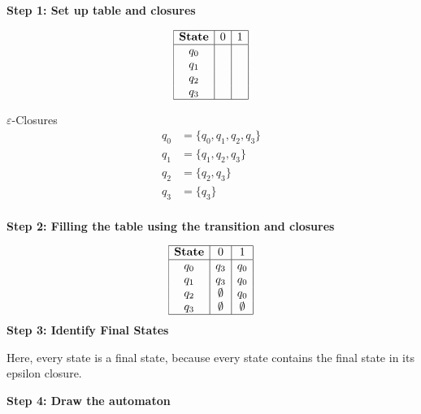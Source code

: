 \textbf{Step 1: Set up table and closures}

\[
    \begin{array}{|c|c|c|}
    \hline
    \textbf{State} & 0              & 1    \\
    \hline
    q_0            &  &   \\
    q_1   &  &   \\
    q_2   &  &   \\
    q_3   &  &   \\
    \hline
    \end{array}
\]

\(\varepsilon\)-Closures
\begin{align*}
    q_0 &= \{q_0, q_1, q_2, q_3\} \\
    q_1 &= \{q_1, q_2, q_3\} \\
    q_2 &= \{q_2, q_3\} \\
    q_3 &= \{q_3\} \\
\end{align*}


\textbf{Step 2: Filling the table using the transition and closures}

\[
    \begin{array}{|c|c|c|}
    \hline
    \textbf{State} & 0              & 1    \\
    \hline
    q_0   & q_3 & q_0  \\
    q_1   & q_3 & q_0  \\
    q_2   & \emptyset & q_0  \\
    q_3   &  \emptyset & \emptyset   \\
    \hline
    \end{array}
\]
\textbf{Step 3: Identify Final States}

Here, every state is a final state, because every state contains the final state in its epsilon closure.

\textbf{Step 4: Draw the automaton}

\begin{center}
\end{center}

